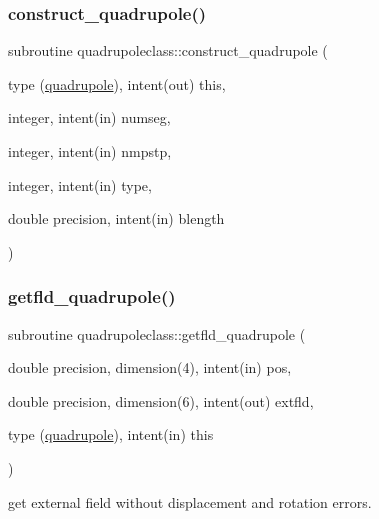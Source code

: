 \subsubsection{\texorpdfstring{construct\_quadrupole()}{construct\_quadrupole()}}
{\footnotesize\ttfamily subroutine quadrupoleclass\+::construct\+\_\+quadrupole (\begin{DoxyParamCaption}\item[{type (\mbox{\hyperlink{namespacequadrupoleclass_structquadrupoleclass_1_1quadrupole}{quadrupole}}), intent(out)}]{this,  }\item[{integer, intent(in)}]{numseg,  }\item[{integer, intent(in)}]{nmpstp,  }\item[{integer, intent(in)}]{type,  }\item[{double precision, intent(in)}]{blength }\end{DoxyParamCaption})}

\mbox{\label{namespacequadrupoleclass_a1d1bf0b4ea88a1cd0c0832a178fc80e5}} 
\subsubsection{\texorpdfstring{getfld\_quadrupole()}{getfld\_quadrupole()}}
{\footnotesize\ttfamily subroutine quadrupoleclass\+::getfld\+\_\+quadrupole (\begin{DoxyParamCaption}\item[{double precision, dimension(4), intent(in)}]{pos,  }\item[{double precision, dimension(6), intent(out)}]{extfld,  }\item[{type (\mbox{\hyperlink{namespacequadrupoleclass_structquadrupoleclass_1_1quadrupole}{quadrupole}}), intent(in)}]{this }\end{DoxyParamCaption})}



get external field without displacement and rotation errors. 

